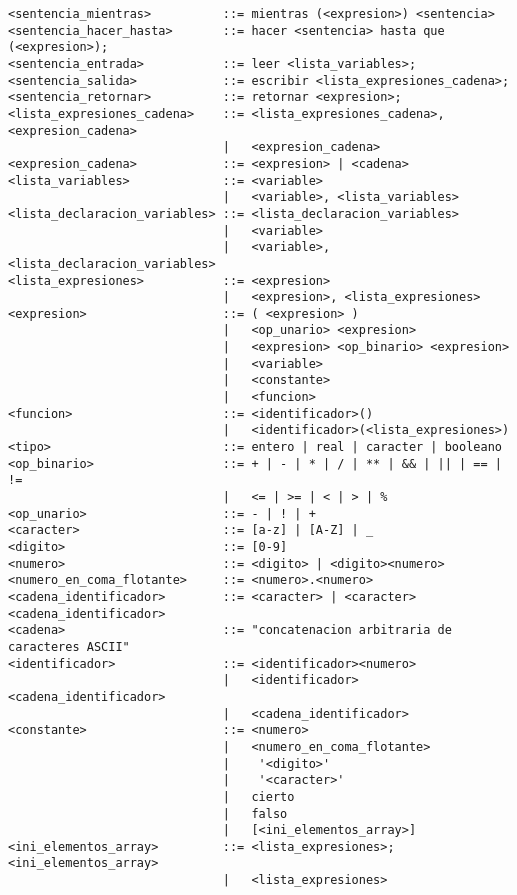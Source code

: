 \begin{lstlisting}[breaklines=true, basicstyle=\tiny]
<sentencia_mientras>          ::= mientras (<expresion>) <sentencia>
<sentencia_hacer_hasta>       ::= hacer <sentencia> hasta que (<expresion>);
<sentencia_entrada>           ::= leer <lista_variables>;
<sentencia_salida>            ::= escribir <lista_expresiones_cadena>;
<sentencia_retornar>          ::= retornar <expresion>;
<lista_expresiones_cadena>    ::= <lista_expresiones_cadena>, <expresion_cadena>
                              |   <expresion_cadena>
<expresion_cadena>            ::= <expresion> | <cadena>
<lista_variables>             ::= <variable>
                              |   <variable>, <lista_variables>
<lista_declaracion_variables> ::= <lista_declaracion_variables>
                              |   <variable>
                              |   <variable>, <lista_declaracion_variables>
<lista_expresiones>           ::= <expresion>
                              |   <expresion>, <lista_expresiones>
<expresion>                   ::= ( <expresion> )
                              |   <op_unario> <expresion>
                              |   <expresion> <op_binario> <expresion>
                              |   <variable>
                              |   <constante>
                              |   <funcion>
<funcion>                     ::= <identificador>()
                              |   <identificador>(<lista_expresiones>)
<tipo>                        ::= entero | real | caracter | booleano
<op_binario>                  ::= + | - | * | / | ** | && | || | == | !=
                              |   <= | >= | < | > | %
<op_unario>                   ::= - | ! | +
<caracter>                    ::= [a-z] | [A-Z] | _
<digito>                      ::= [0-9]
<numero>                      ::= <digito> | <digito><numero>
<numero_en_coma_flotante>     ::= <numero>.<numero>
<cadena_identificador>        ::= <caracter> | <caracter><cadena_identificador>
<cadena>                      ::= "concatenacion arbitraria de caracteres ASCII"
<identificador>               ::= <identificador><numero>
                              |   <identificador><cadena_identificador>
                              |   <cadena_identificador>
<constante>                   ::= <numero>
                              |   <numero_en_coma_flotante>
                              |    '<digito>'
                              |    '<caracter>'
                              |   cierto
                              |   falso
                              |   [<ini_elementos_array>]
<ini_elementos_array>         ::= <lista_expresiones>; <ini_elementos_array>
                              |   <lista_expresiones>
\end{lstlisting}


